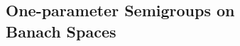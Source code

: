 
\begin{partbacktext}
\part[One-parameter Semigroups on Banach Spaces]{One-parameter Semigroups on \\Banach Spaces }
\end{partbacktext}